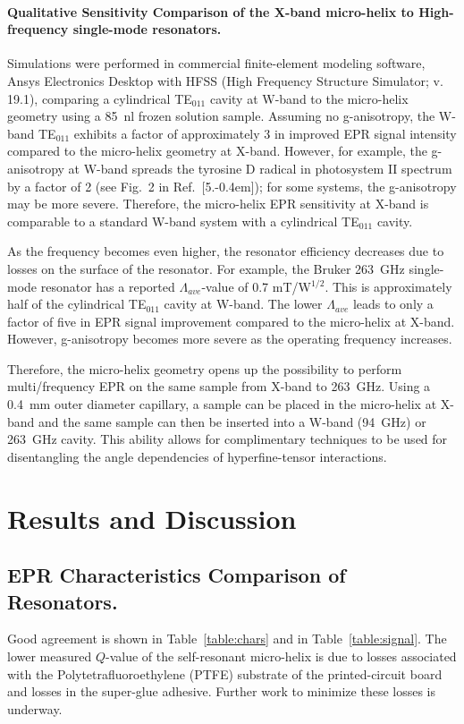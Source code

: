 \paragraph{Qualitative Sensitivity Comparison of the X-band micro-helix to High-frequency single-mode resonators.}
Simulations were performed in commercial finite-element modeling software, Ansys Electronics Desktop with HFSS (High Frequency Structure Simulator; v. 19.1), comparing a cylindrical TE$_{011}$ cavity at W-band to the micro-helix geometry using a 85~nl frozen solution sample. Assuming no g-anisotropy, the W-band TE$_{011}$ exhibits a factor of approximately 3 in improved EPR signal intensity compared to the micro-helix geometry at X-band. However, for example, the g-anisotropy at W-band spreads the tyrosine D radical in photosystem II spectrum by a factor of 2 (see Fig.~2 in Ref.~[5.\kern-0.4em]); for some systems, the g-anisotropy may be more severe. Therefore, the micro-helix EPR sensitivity at X-band is comparable to a standard W-band system with a cylindrical TE$_{011}$ cavity. 

As the frequency becomes even higher, the resonator efficiency decreases due to losses on the surface of the resonator. For example, the Bruker 263~GHz single-mode resonator has a reported $\Lambda_{ave}$-value of 0.7 mT/W$^{1/2}$. \cite{bruker263} This is approximately half of the cylindrical TE$_{011}$ cavity at W-band. The lower $\Lambda_{ave}$ leads to only a factor of five in EPR signal improvement compared to the micro-helix at X-band. However, g-anisotropy becomes more severe as the operating frequency increases.

Therefore, the micro-helix geometry opens up the possibility to perform multi\-/frequency EPR on the same sample from X-band to 263~GHz. Using a 0.4~mm outer diameter capillary, a sample can be placed in the micro-helix at X-band and the same sample can then be inserted into a W-band (94~GHz) or 263~GHz cavity. This ability allows for complimentary techniques to be used for disentangling the angle dependencies of hyperfine-tensor interactions.

\section{Results and Discussion}
\subsection{EPR Characteristics Comparison of Resonators.}
Good agreement is shown in Table~\ref{table:chars} and in Table~\ref{table:signal}. The lower measured $Q$-value of the self-resonant micro-helix is due to losses associated with the Polytetrafluoroethylene (PTFE) substrate of the printed-circuit board and losses in the super-glue adhesive. Further work to minimize these losses is underway.


